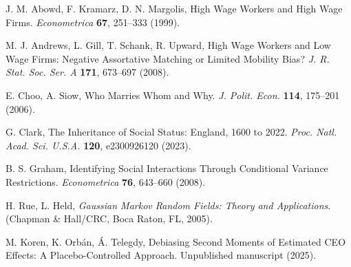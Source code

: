 \documentclass[9pt,twocolumn,twoside]{pnas-new}
\begin{document}
\showmatmethods{}


\showacknow{}

\begin{thebibliography}{9}

J. M. Abowd, F. Kramarz, D. N. Margolis, 
High Wage Workers and High Wage Firms. 
\textit{Econometrica} \textbf{67}, 251--333 (1999).

M. J. Andrews, L. Gill, T. Schank, R. Upward, 
High Wage Workers and Low Wage Firms: Negative Assortative Matching or Limited Mobility Bias? 
\textit{J. R. Stat. Soc. Ser. A} \textbf{171}, 673--697 (2008).

E. Choo, A. Siow, 
Who Marries Whom and Why. 
\textit{J. Polit. Econ.} \textbf{114}, 175--201 (2006).

G. Clark, 
The Inheritance of Social Status: England, 1600 to 2022. 
\textit{Proc. Natl. Acad. Sci. U.S.A.} \textbf{120}, e2300926120 (2023).

B. S. Graham, 
Identifying Social Interactions Through Conditional Variance Restrictions. 
\textit{Econometrica} \textbf{76}, 643--660 (2008).

H. Rue, L. Held, 
\textit{Gaussian Markov Random Fields: Theory and Applications}. 
(Chapman \& Hall/CRC, Boca Raton, FL, 2005).

M. Koren, K. Orbán, Á. Telegdy, 
Debiasing Second Moments of Estimated CEO Effects: A Placebo-Controlled Approach. 
Unpublished manuscript (2025).

\end{thebibliography}
\end{document}
